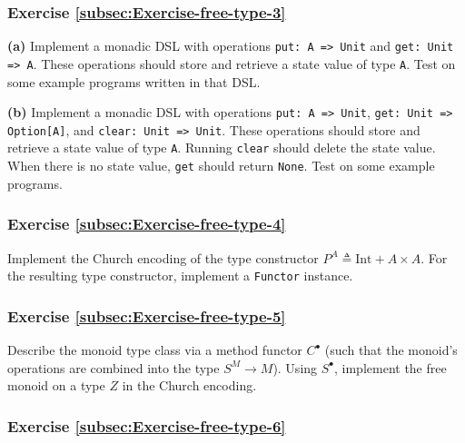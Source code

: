 \subsubsection{Exercise \label{subsec:Exercise-free-type-3}\ref{subsec:Exercise-free-type-3}}

\textbf{(a)} Implement a monadic DSL with operations \lstinline!put: A => Unit!
and \lstinline!get: Unit => A!.
These operations should store and retrieve a state value of type \lstinline!A!.
Test on some example programs written in that DSL. 

\textbf{(b)} Implement a monadic DSL with operations \lstinline!put: A => Unit!,
\lstinline!get: Unit => Option[A]!,
and \lstinline!clear: Unit => Unit!.
These operations should store and retrieve a state value of type \lstinline!A!.
Running \lstinline!clear!
should delete the state value. When there is no state value, \lstinline!get!
should return \lstinline!None!.
Test on some example programs.

\subsubsection{Exercise \label{subsec:Exercise-free-type-4}\ref{subsec:Exercise-free-type-4}}

Implement the Church encoding of the type constructor $P^{A}\triangleq\text{Int}+A\times A$.
For the resulting type constructor, implement a \lstinline!Functor!
instance.

\subsubsection{Exercise \label{subsec:Exercise-free-type-5}\ref{subsec:Exercise-free-type-5}}

Describe the monoid type class via a method functor $C^{\bullet}$
(such that the monoid\textsf{'}s operations are combined into the type $S^{M}\rightarrow M$).
Using $S^{\bullet}$, implement the free monoid on a type $Z$ in
the Church encoding.

\subsubsection{Exercise \label{subsec:Exercise-free-type-6}\ref{subsec:Exercise-free-type-6}}

